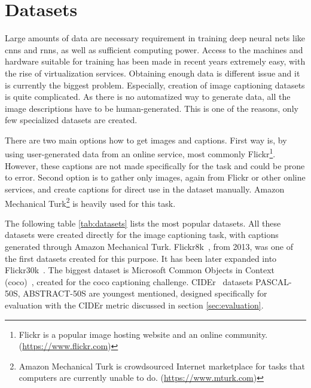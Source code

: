 \section{Datasets}\label{sec:datasets}

Large amounts of data are necessary requirement in training deep neural nets like  \gls{cnn}s and \gls{rnn}s, as well as sufficient computing power. Access to the machines and hardware suitable for training has been made in recent years extremely easy, with the rise of virtualization services. Obtaining enough data is different issue and it is currently the biggest problem. Especially, creation of image captioning datasets is quite complicated. As there is no automatized way to generate data, all the image descriptions have to be human-generated. This is one of the reasons, only few specialized datasets are created.

There are two main options how to get images and captions. First way is, by using user-generated data from an online service, most commonly Flickr\footnote{Flickr is a popular image hosting website and an online community. (\url{https://www.flickr.com})}. However, these captions are not made specifically for the task and could be prone to error. Second option is to gather only images, again from Flickr or other online services, and create captions for direct use in the dataset manually. Amazon Mechanical Turk\footnote{Amazon Mechanical Turk is crowdsourced Internet marketplace for tasks that computers are currently unable to do. (\url{https://www.mturk.com})} is heavily used for this task.

The following table \ref{tab:datasets} lists the most popular datasets. All these datasets were created directly for the image captioning task, with captions generated through Amazon Mechanical Turk. Flickr8k~\cite{dataset-flickr8k}, from 2013, was one of the first datasets created for this purpose. It has been later expanded into Flickr30k~\cite{dataset-flickr30k}. The biggest dataset is Microsoft Common Objects in Context (\gls{coco})~\cite{DBLP:journals/corr/ChenFLVGDZ15}, created for the \gls{coco} captioning challenge. CIDEr~\cite{Vedantam_2015_CVPR} datasets PASCAL-50S, ABSTRACT-50S are youngest mentioned, designed specifically for evaluation with the CIDEr metric discussed in section \ref{sec:evaluation}.

\def\arraystretch{1.2}%

